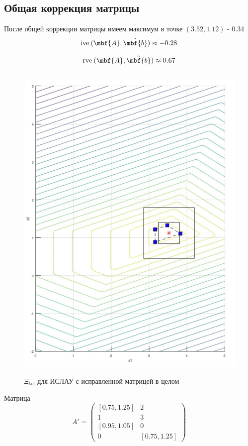 \documentclass[12pt,a4paper]{article}
\begin{document}
    \subsection{Общая коррекция матрицы}
    
    После общей коррекции матрицы имеем максимум в точке $(3.52,1.12)$ - 0.34
    $$
        \mathrm{ive}\:(\mbf{A}, \hat{\mbf{b}})\approx-0.28
    $$
    
    $$
        \mathrm{rve}\:(\mbf{A}, \hat{\mbf{b}})\approx0.67
    $$ 
    \begin{figure}[H]
        \centering
        \includegraphics[height=16cm]{tol_left.png}
        \caption{$\Xi_{\mathrm{tol}}$ для ИСЛАУ с исправленной матрицей в целом}
        \label{fig:changeAGeneral}
    \end{figure}

    Матрица
    $$
    A' = \begin{pmatrix}
    [0.75, 1.25] & 2 \\
    1 & 3 \\
    [0.95, 1.05] & 0 \\
    0 & [0.75, 1.25]
    \end{pmatrix}
    $$
    
\end{document}
